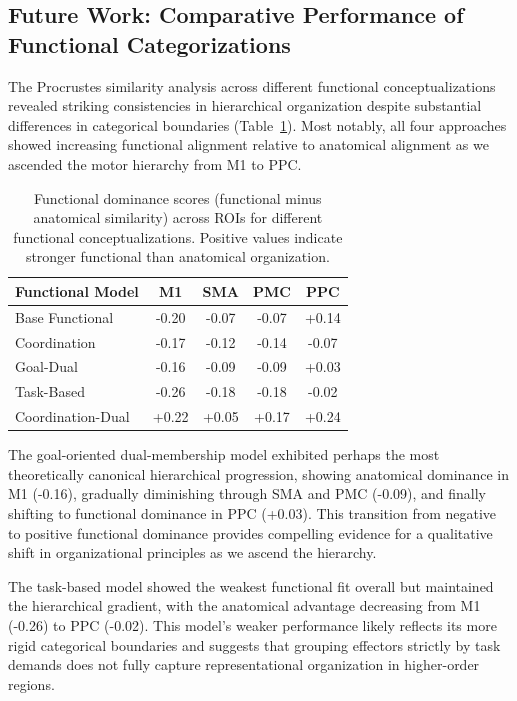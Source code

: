 \documentclass{article}
\begin{document}
\subsection{Future Work: Comparative Performance of Functional Categorizations}\label{sec:future_work}

The Procrustes similarity analysis across different functional conceptualizations revealed striking consistencies in hierarchical organization despite substantial differences in categorical boundaries (Table~\ref{tab:procrustes_comparison_ext}). Most notably, all four approaches showed increasing functional alignment relative to anatomical alignment as we ascended the motor hierarchy from M1 to PPC.

\begin{table}[h]
\centering
\small
\begin{tabular}{|l|c|c|c|c|}
\hline
\textbf{Functional Model} & \textbf{M1} & \textbf{SMA} & \textbf{PMC} & \textbf{PPC} \\
\hline
Base Functional & -0.20 & -0.07 & -0.07 & +0.14 \\
Coordination & -0.17 & -0.12 & -0.14 & -0.07 \\
Goal-Dual & -0.16 & -0.09 & -0.09 & +0.03 \\
Task-Based & -0.26 & -0.18 & -0.18 & -0.02 \\
Coordination-Dual & +0.22 & +0.05 & +0.17 & +0.24 \\
\hline
\end{tabular}
\caption{Functional dominance scores (functional minus anatomical similarity) across ROIs for different functional conceptualizations. Positive values indicate stronger functional than anatomical organization.}
\label{tab:procrustes_comparison_ext}
\end{table}

The goal-oriented dual-membership model exhibited perhaps the most theoretically canonical hierarchical progression, showing anatomical dominance in M1 (-0.16), gradually diminishing through SMA and PMC (-0.09), and finally shifting to functional dominance in PPC (+0.03). This transition from negative to positive functional dominance provides compelling evidence for a qualitative shift in organizational principles as we ascend the hierarchy.

The task-based model showed the weakest functional fit overall but maintained the hierarchical gradient, with the anatomical advantage decreasing from M1 (-0.26) to PPC (-0.02). This model's weaker performance likely reflects its more rigid categorical boundaries and suggests that grouping effectors strictly by task demands does not fully capture representational organization in higher-order regions.
\end{document}
